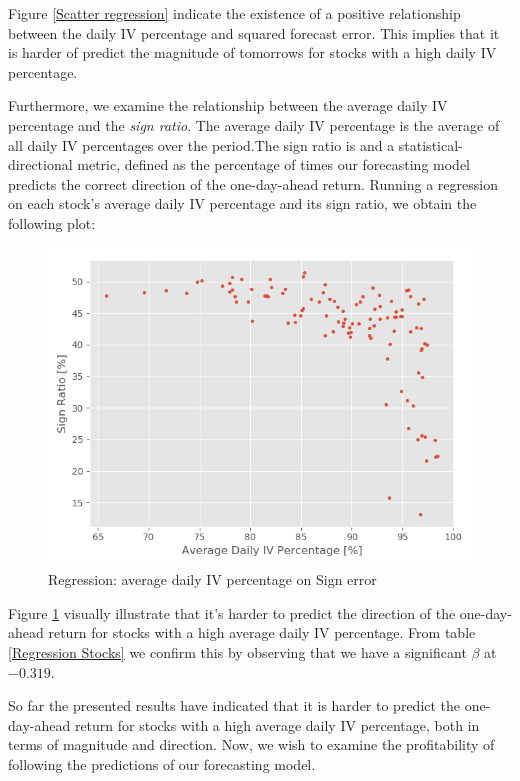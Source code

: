 Figure \ref{Scatter regression} indicate the existence of a positive relationship between the daily IV percentage and squared forecast error. This implies that it is harder of predict the magnitude of tomorrows for stocks with a high daily IV percentage.

Furthermore, we examine the relationship between the average daily IV percentage and the \textit{sign ratio}. The average daily IV percentage is the average of all daily IV percentages over the period.The sign ratio is and a statistical-directional metric, defined as the percentage of times our forecasting model predicts the correct direction of the one-day-ahead return. Running a regression on each stock's average daily IV percentage and its sign ratio, we obtain the following plot: 

\begin{figure}[h]
    \centering
    \includegraphics[scale = 0.5]{Plot/IndividualStockRegression1.png}
    \caption{Regression: average daily IV percentage on Sign error}
    \label{IVSignError}
\end{figure}

Figure \ref{IVSignError} visually illustrate that it's harder to predict the direction of the one-day-ahead return for stocks with a high average daily IV percentage. From table \ref{Regression Stocks} we confirm this by observing that we have a significant $\beta$ at $-0.319$.

So far the presented results have indicated that it is harder to predict the one-day-ahead return for stocks with a high average daily IV percentage, both in terms of magnitude and direction. Now, we wish to examine the profitability of following the predictions of our forecasting model. 

